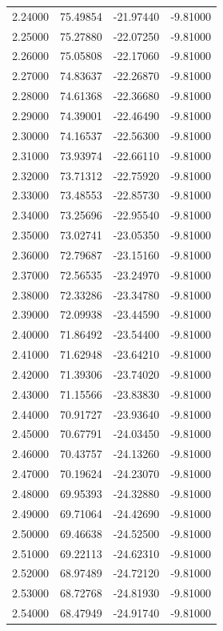 \begin{table}
\begin{tabular}{llll}
2.24000 & 75.49854 & -21.97440 & -9.81000 \\
2.25000 & 75.27880 & -22.07250 & -9.81000 \\
2.26000 & 75.05808 & -22.17060 & -9.81000 \\
2.27000 & 74.83637 & -22.26870 & -9.81000 \\
2.28000 & 74.61368 & -22.36680 & -9.81000 \\
2.29000 & 74.39001 & -22.46490 & -9.81000 \\
2.30000 & 74.16537 & -22.56300 & -9.81000 \\
2.31000 & 73.93974 & -22.66110 & -9.81000 \\
2.32000 & 73.71312 & -22.75920 & -9.81000 \\
2.33000 & 73.48553 & -22.85730 & -9.81000 \\
2.34000 & 73.25696 & -22.95540 & -9.81000 \\
2.35000 & 73.02741 & -23.05350 & -9.81000 \\
2.36000 & 72.79687 & -23.15160 & -9.81000 \\
2.37000 & 72.56535 & -23.24970 & -9.81000 \\
2.38000 & 72.33286 & -23.34780 & -9.81000 \\
2.39000 & 72.09938 & -23.44590 & -9.81000 \\
2.40000 & 71.86492 & -23.54400 & -9.81000 \\
2.41000 & 71.62948 & -23.64210 & -9.81000 \\
2.42000 & 71.39306 & -23.74020 & -9.81000 \\
2.43000 & 71.15566 & -23.83830 & -9.81000 \\
2.44000 & 70.91727 & -23.93640 & -9.81000 \\
2.45000 & 70.67791 & -24.03450 & -9.81000 \\
2.46000 & 70.43757 & -24.13260 & -9.81000 \\
2.47000 & 70.19624 & -24.23070 & -9.81000 \\
2.48000 & 69.95393 & -24.32880 & -9.81000 \\
2.49000 & 69.71064 & -24.42690 & -9.81000 \\
2.50000 & 69.46638 & -24.52500 & -9.81000 \\
2.51000 & 69.22113 & -24.62310 & -9.81000 \\
2.52000 & 68.97489 & -24.72120 & -9.81000 \\
2.53000 & 68.72768 & -24.81930 & -9.81000 \\
2.54000 & 68.47949 & -24.91740 & -9.81000 \\

\end{tabular}
\end{table}
